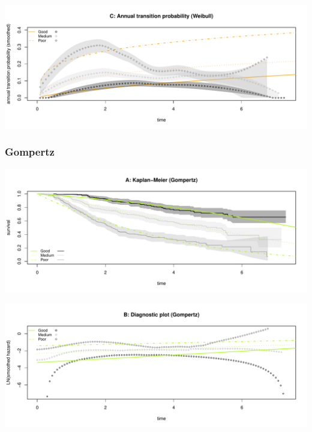 \documentclass[
]{article}
\begin{document}
\begin{flushleft}\includegraphics[height=0.25\textheight]{BC_OS_output/Images/Figure_param_models-6} \end{flushleft}

\clearpage

\subsubsection{Gompertz}\label{gompertz}

\begin{flushleft}\includegraphics[height=0.25\textheight]{BC_OS_output/Images/Figure_param_models-7} \end{flushleft}

\begin{flushleft}\includegraphics[height=0.25\textheight]{BC_OS_output/Images/Figure_param_models-8} \end{flushleft}
\end{document}

